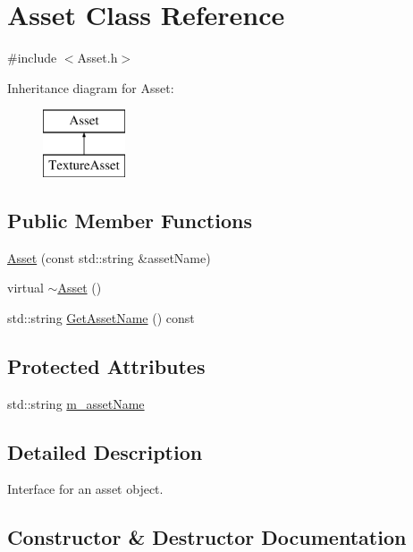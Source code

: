 \hypertarget{class_asset}{}\section{Asset Class Reference}
\label{class_asset}


{\ttfamily \#include $<$Asset.\+h$>$}

Inheritance diagram for Asset\+:\begin{figure}[H]
\begin{center}
\leavevmode
\includegraphics[height=2.000000cm]{class_asset}
\end{center}
\end{figure}
\subsection*{Public Member Functions}
\begin{DoxyCompactItemize}
\item 
\mbox{\hyperlink{class_asset_a1c98c4e76529bc36e1de256d26987e75}{Asset}} (const std\+::string \&asset\+Name)
\item 
virtual \mbox{\hyperlink{class_asset_a46a781917d9ef0be7d6efe79390fe4e6}{$\sim$\+Asset}} ()
\item 
std\+::string \mbox{\hyperlink{class_asset_a7a2d56b7eae0869a5c4fef6a5ca84436}{Get\+Asset\+Name}} () const
\end{DoxyCompactItemize}
\subsection*{Protected Attributes}
\begin{DoxyCompactItemize}
\item 
std\+::string \mbox{\hyperlink{class_asset_a7333657af418ff8386d70be9771d00cc}{m\+\_\+asset\+Name}}
\end{DoxyCompactItemize}


\subsection{Detailed Description}
Interface for an asset object. 

\subsection{Constructor \& Destructor Documentation}
\mbox{\label{class_asset_a1c98c4e76529bc36e1de256d26987e75}} 
